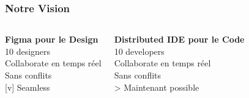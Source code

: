 \documentclass[aspectratio=16:9]{beamer}
\begin{document}
\begin{frame}
  \frametitle{Notre Vision}
  
  \begin{columns}
    \centering
    \Large\textbf{Figma pour le Design}\\[0.5cm]
    \small 10 designers\\
    Collaborate en temps réel\\
    Sans conflits\\
    \textcolor{SuccessGreen}{[v] Seamless}
    
    \centering
    \Large\textbf{Distributed IDE pour le Code}\\[0.5cm]
    \small 10 developers\\
    Collaborate en temps réel\\
    Sans conflits\\
    \textcolor{AccentOrange}{> Maintenant possible}
  \end{columns}
  
  \vspace{1cm}
  
\end{frame}
\end{document}
